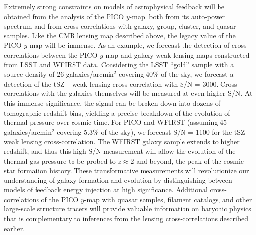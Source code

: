 \documentclass[PICOReport.tex]{subfiles}
\begin{document}
Extremely strong constraints on models of astrophysical feedback will be obtained from the analysis of the PICO $y$-map, both from its auto-power spectrum and from cross-correlations with galaxy, group, cluster, and quasar samples.  Like the CMB lensing map described above, the legacy value of the PICO $y$-map will be immense.  As an example, we forecast the detection of cross-correlations between the PICO $y$-map and galaxy weak lensing maps constructed from LSST and WFIRST data.  Considering the LSST ``gold'' sample with a source density of 26 galaxies/arcmin${}^2$ covering 40\% of the sky, we forecast a detection of the tSZ -- weak lensing cross-correlation with S/N = 3000.  Cross-correlations with the galaxies themselves will be measured at even higher S/N.  At this immense significance, the signal can be broken down into dozens of tomographic redshift bins, yielding a precise breakdown of the evolution of thermal pressure over cosmic time.  For PICO and WFIRST (assuming 45 galaxies/arcmin${}^2$ covering 5.3\% of the sky), we forecast S/N = 1100 for the tSZ -- weak lensing cross-correlation.  The WFIRST galaxy sample extends to higher redshift, and thus this high-S/N measurement will allow the evolution of the thermal gas pressure to be probed to $z \approx 2$ and beyond, the peak of the cosmic star formation history.  These transformative measurements will revolutionize our understanding of galaxy formation and evolution by distinguishing between models of feedback energy injection at high significance.  Additional cross-correlations of the PICO $y$-map with quasar samples, filament catalogs, and other large-scale structure tracers will provide valuable information on baryonic physics that is complementary to inferences from the lensing cross-correlations described earlier. %
\end{document}
